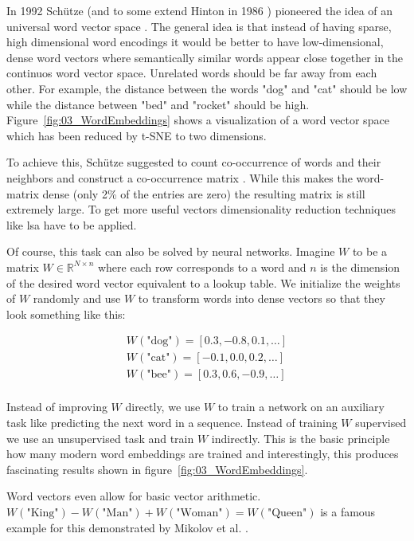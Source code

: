 In 1992 Schütze {(and to some extend Hinton in 1986 \cite{Hinton1986})} pioneered the idea of an universal word vector space \cite{Schutze1992}. The general idea is that instead of having sparse, high dimensional word encodings it would be better to have low-dimensional, dense word vectors where semantically similar words appear close together in the continuos word vector space. Unrelated words should be far away from each other. For example, the distance between the words "dog" and "cat" should be low while the distance between "bed" and "rocket" should be high. Figure~\ref{fig:03_WordEmbeddings} shows a visualization of a word vector space which has been reduced by t-SNE to two dimensions.
\medskip

To achieve this, Schütze suggested to count co-occurrence of words and their neighbors and construct a co-occurrence matrix \cite{Schutze1992}. While this makes the word-matrix dense {(only 2\% of the entries are zero)} the resulting matrix is still extremely large. To get more useful vectors dimensionality reduction techniques like \gls{lsa} have to be applied.
\medskip

Of course, this task can also be solved by neural networks. Imagine $W$ to be a matrix $W \in \mathbb{R}^{N\times n}$ where each row corresponds to a word and $n$ is the dimension of the desired word vector equivalent to a lookup table. We initialize the weights of $W$ randomly and use $W$ to transform words into dense vectors so that they look something like this:

\begin{equation*}
	\begin{aligned}
		W(\text{"dog"}) = [0.3, -0.8, 0.1, \dots] \\
		W(\text{"cat"}) = [-0.1, 0.0, 0.2, \dots] \\
		W(\text{"bee"}) = [0.3, 0.6, -0.9, \dots] \\
	\end{aligned}
\end{equation*}

Instead of improving $W$ directly, we use $W$ to train a network on an auxiliary task like predicting the next word in a sequence. Instead of training $W$ supervised we use an unsupervised task and train $W$ indirectly. This is the basic principle how many modern word embeddings are trained and interestingly, this produces fascinating results shown in figure~\ref{fig:03_WordEmbeddings}.
\medskip

Word vectors even allow for basic vector arithmetic. $W(\text{"King"})-W(\text{"Man"})+W(\text{"Woman"})=W(\text{"Queen"})$ is a famous example for this demonstrated by Mikolov et al. \cite{Mikolov2013d}.
\medskip

